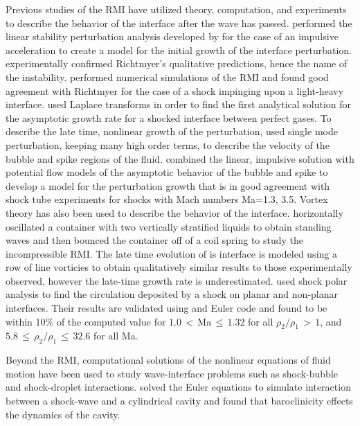 Previous studies of the \ac{RMI} have utilized theory, computation,
and experiments to describe the behavior of the interface after the
wave has passed. \cite{Richtmyer1960} performed the linear stability
perturbation analysis developed by \cite{Taylor1950} for the case of
an impulsive acceleration to create a model for the initial growth of
the interface perturbation. \cite{Meshkov1969} experimentally
confirmed Richtmyer's qualitative predictions, hence the name of the
instability. \cite{Meyer1972} performed numerical simulations of the
\ac{RMI} and found good agreement with Richtmyer for the case of a
shock impinging upon a light-heavy interface. \cite{Fraley1986} used
Laplace transforms in order to find the first analytical solution for
the asymptotic growth rate for a shocked interface between perfect
gases. To describe the late time, nonlinear growth of the
perturbation, \cite{Zhang1997} used single mode perturbation, keeping
many high order terms, to describe the velocity of the bubble and
spike regions of the fluid. \cite{Sadot1998} combined the linear,
impulsive solution with potential flow models of the asymptotic
behavior of the bubble and spike to develop a model for the
perturbation growth that is in good agreement with shock tube
experiments for shocks with Mach numbers Ma=1.3, 3.5. Vortex theory
has also been used to describe the behavior of the
interface. \cite{Jacobs1996} horizontally oscillated a container with
two vertically stratified liquids to obtain standing waves and then
bounced the container off of a coil spring to study the incompressible
\ac{RMI}. The late time evolution of is interface is modeled using a
row of line vorticies to obtain qualitatively similar results to those
experimentally observed, however the late-time growth rate is
underestimated. \cite{Samtaney1994} used shock polar analysis to find
the circulation deposited by a shock on planar and non-planar
interfaces. Their results are validated using and Euler code and found
to be within 10\% of the computed value for $1.0\,<\,$Ma$\,\leq\,1.32$
for all $\rho_2/\rho_1\,>\,1$, and
$5.8\,\leq\,\rho_2/\rho_1\,\leq\,32.6$ for all Ma.

Beyond the \ac{RMI}, computational solutions of the nonlinear
equations of fluid motion have been used to study wave-interface
problems such as shock-bubble and shock-droplet
interactions. \cite{Ball2000} solved the Euler equations to simulate
interaction between a shock-wave and a cylindrical cavity and found
that baroclinicity effects the dynamics of the cavity.


